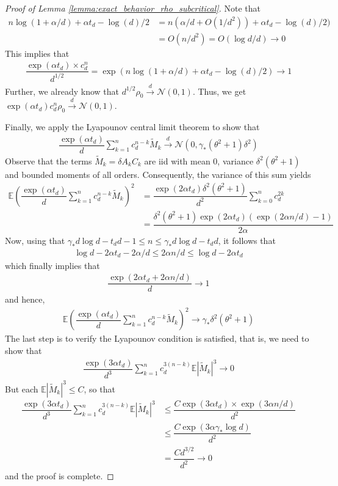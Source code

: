 \documentclass[10pt,a4paper]{amsart}
\newcommand{\E}{\mathbb{E}}
\def\gN{{\mathcal{N}}}
\begin{document}
\begin{proof}[Proof of Lemma \ref{lemma:exact_behavior_rho_subcritical}]
    Note that
    \begin{align*}
    n\log(1+\alpha/d)+\alpha t_d-\log(d)/{2} &= n(\alpha/d + O(1/d^2)) +\alpha t_d -\log(d)/2)\\
    &=O(n/d^2)=O(\log d/d)\to 0
    \end{align*}This implies that 
    \begin{align*}
        \dfrac{\exp(\alpha t_d)\times c_d^n}{d^{1/2}}= \exp\left(n\log(1+\alpha/d)+\alpha t_d-\log(d)/{2}\right)\to 1
    \end{align*}Further, we already know that $d^{1/2}\rho_0\stackrel{d}{\to}\gN(0,1)$. Thus, we get $\exp(\alpha t_d)c_d^n\rho_0\stackrel{d}{\to}\gN(0,1)$.

    Finally, we apply the Lyapounov central limit theorem to show that
\begin{align*}
    \dfrac{\exp(\alpha t_d)}{d}\sum_{k=1}^n c_d^{n-k}\tilde M_k\stackrel{d}{\to}\gN(0,\gamma_*(\theta^2+1)\delta^2)
\end{align*} Observe that the terms $\tilde M_k=\delta A_kC_k$ are iid with mean $0$, variance $\delta^2(\theta^2+1)$ and bounded moments of all orders. Consequently, the variance of this sum yields
\begin{align*}
    \E\left(\dfrac{\exp(\alpha t_d)}{d}\sum_{k=1}^nc_d^{n-k}\tilde M_k\right)^2 &= \dfrac{\exp(2\alpha t_d)\delta^2(\theta^2+1)}{d^2}\sum_{k=0}^n c_d^{2k}\\
    &=\dfrac{\delta^2(\theta^2+1)\exp(2\alpha t_d)(\exp(2\alpha n/d)-1)}{2\alpha}
\end{align*}Now, using that $\gamma_*d\log d-t_d d-1\leq n\leq \gamma_*d\log d-t_d d$, it follows that
\begin{align*}
    \log d - 2\alpha t_d - 2\alpha/d \leq 2\alpha n/d\leq \log d - 2\alpha t_d
\end{align*}which finally implies that
\begin{align*}
    \dfrac{\exp(2\alpha t_d + 2\alpha n/d) }{d}\to 1
\end{align*}and hence, 
\begin{align*}
    \E\left(\dfrac{\exp(\alpha t_d)}{d}\sum_{k=1}^nc_d^{n-k}\tilde M_k\right)^2 \to \gamma_*\delta^2(\theta^2+1)
\end{align*} The last step is to verify the Lyapounov condition is satisfied, that is, we need to show that
\begin{align*}
    \dfrac{\exp(3\alpha t_d)}{d^3}\sum_{k=1}^nc_d^{3(n-k)}\E|\tilde M_k|^3\to 0
\end{align*}But each $\E|\tilde M_k|^3\leq C$, so that
\begin{align*}
    \dfrac{\exp(3\alpha t_d)}{d^3}\sum_{k=1}^nc_d^{3(n-k)}\E|\tilde M_k|^3 &\leq \dfrac{C\exp(3\alpha t_d)\times \exp(3\alpha n/d)}{d^2}\\
    &\leq \dfrac{C\exp(3\alpha \gamma_*\log d)}{d^2}\\
    &=\dfrac{Cd^{3/2}}{d^2}\to 0
\end{align*}and the proof is complete.\end{proof}
\end{document}
